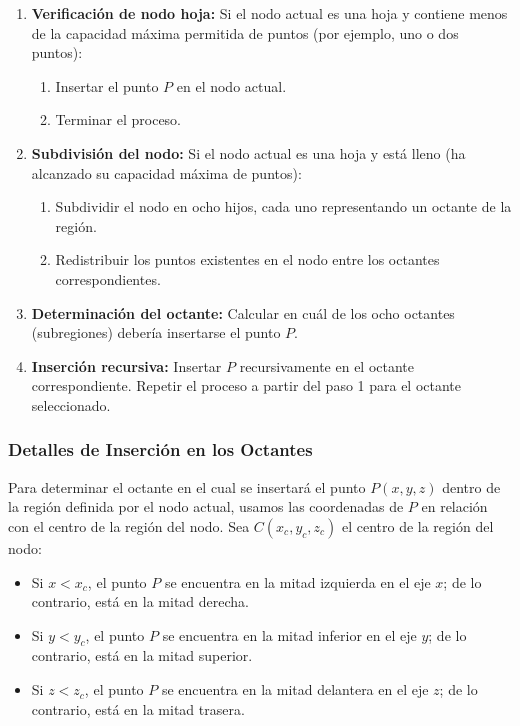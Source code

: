 \documentclass{article}
\begin{document}
\begin{enumerate}
    \item \textbf{Verificación de nodo hoja:} Si el nodo actual es una hoja y contiene menos de la capacidad máxima permitida de puntos (por ejemplo, uno o dos puntos):
    \begin{enumerate}
        \item Insertar el punto \(P\) en el nodo actual.
        \item Terminar el proceso.
    \end{enumerate}
    \item \textbf{Subdivisión del nodo:} Si el nodo actual es una hoja y está lleno (ha alcanzado su capacidad máxima de puntos):
    \begin{enumerate}
        \item Subdividir el nodo en ocho hijos, cada uno representando un octante de la región.
        \item Redistribuir los puntos existentes en el nodo entre los octantes correspondientes.
    \end{enumerate}
    \item \textbf{Determinación del octante:} Calcular en cuál de los ocho octantes (subregiones) debería insertarse el punto \(P\).
    \item \textbf{Inserción recursiva:} Insertar \(P\) recursivamente en el octante correspondiente. Repetir el proceso a partir del paso 1 para el octante seleccionado.
\end{enumerate}

\subsubsection{Detalles de Inserción en los Octantes}

Para determinar el octante en el cual se insertará el punto \(P(x, y, z)\) dentro de la región definida por el nodo actual, usamos las coordenadas de \(P\) en relación con el centro de la región del nodo. Sea \(C(x_c, y_c, z_c)\) el centro de la región del nodo:

\begin{itemize}
    \item Si \(x < x_c\), el punto \(P\) se encuentra en la mitad izquierda en el eje \(x\); de lo contrario, está en la mitad derecha.
    \item Si \(y < y_c\), el punto \(P\) se encuentra en la mitad inferior en el eje \(y\); de lo contrario, está en la mitad superior.
    \item Si \(z < z_c\), el punto \(P\) se encuentra en la mitad delantera en el eje \(z\); de lo contrario, está en la mitad trasera.
\end{itemize}
\end{document}
